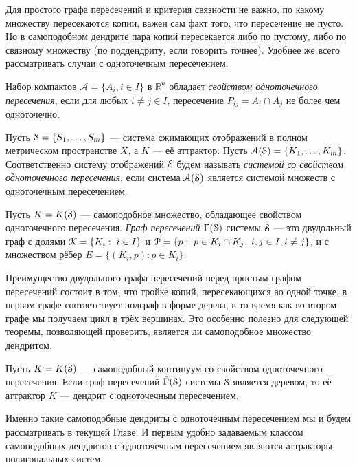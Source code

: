 Для простого графа пересечений и критерия связности не важно, по какому множеству пересекаются копии, важен сам факт того, что пересечение не пусто. 
Но в самоподобном дендрите пара копий пересекается либо по пустому, либо по связному множеству (по поддендриту, если говорить точнее).
Удобнее же всего рассматривать случаи с одноточечным пересечением.

Набор компактов $\mathcal{A}=\{A_i,i\in I\}$ в $\mathbb{R}^n$ обладает {\em свойством одноточечного пересечения}, если для любых $i\neq j\in I$, пересечение $P_{ij}=A_i\cap A_j$ не более чем одноточечно.

Пусть ${\EuScript S}=\{S_1,\ldots ,S_m\}$ --- система сжимающих отображений в полном метрическом пространстве $X$, а $K$ --- её аттрактор. 
Пусть ${\EuScript A}({\EuScript S})=\{K_1,\ldots , K_m\}$. %
Соответственно систему отображений ${\EuScript S}$ будем называть {\em системой со свойством одноточечного пересечения}, если система ${\EuScript A}({\EuScript S})$ является системой множеств с одноточечным пересечением.

\begin{definition}
Пусть $K=K({\EuScript S})$ --- самоподобное множество, обладающее свойством одноточечного пересечения.
{\em Граф пересечений} $\Gamma({\EuScript S})$ системы ${\EuScript S}$ --- это двудольный граф с долями ${\EuScript K}=\{K_i:\; i\in I\}$ и ${\EuScript P}=\{p:\;p\in K_i\cap K_j,\; i,j\in I, i\neq j\}$, и с множеством рёбер $E=\{(K_i,p):p\in K_i\}$.
\end{definition}

Преимущество двудольного графа пересечений перед простым графом пересечений состоит в том, что тройке копий, пересекающихся ао одной точке, в первом графе соответствует подграф в форме дерева, в то время как во втором графе мы получаем цикл в трёх вершинах.
Это особенно полезно для следующей теоремы, позволяющей проверить, является ли самоподобное множество дендритом.

\begin{theorem}[Tetenov A. V. (2021)]
Пусть $K=K({\EuScript S})$ --- самоподобный континуум со свойством одноточечного пересечения.
Если граф пересечений $\hat\Gamma({\EuScript S})$ системы ${\EuScript S}$ является деревом, то её аттрактор $K$ --- дендрит с одноточечным пересечением.
\end{theorem}

Именно такие самоподобные дендриты с одноточечным пересечением мы и будем рассматривать в текущей Главе.
И первым удобно задаваемым классом самоподобных дендритов с одноточечным пересечением являются аттракторы полигональных систем.


